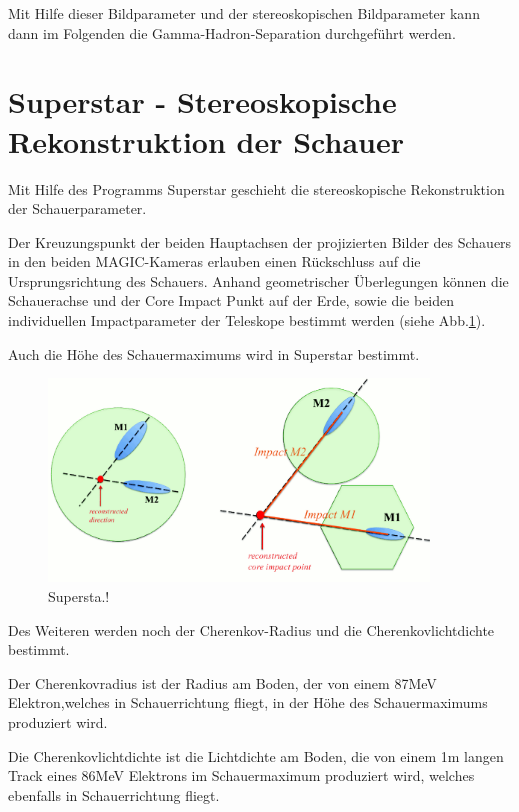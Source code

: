 Mit Hilfe dieser Bildparameter und der stereoskopischen Bildparameter kann dann im Folgenden die Gamma-Hadron-Separation durchgeführt werden.


\section{Superstar - Stereoskopische Rekonstruktion der Schauer}
Mit Hilfe des Programms Superstar geschieht die stereoskopische Rekonstruktion der Schauerparameter.

Der Kreuzungspunkt der beiden Hauptachsen der projizierten Bilder des Schauers in den beiden MAGIC-Kameras erlauben einen Rückschluss auf die Ursprungsrichtung des Schauers.
Anhand geometrischer Überlegungen können die Schauerachse und der Core Impact Punkt auf der Erde, sowie die beiden individuellen Impactparameter der Teleskope bestimmt werden (siehe Abb.\ref{Superstar}).

Auch die Höhe des Schauermaximums wird in Superstar bestimmt.

\begin{figure}
    \centering
    \includegraphics[width=0.9\textwidth]{./Plots/Superstar.png}
    \caption{Supersta.!}
    \label{Superstar}
\end{figure}

Des Weiteren werden noch der Cherenkov-Radius und die Cherenkovlichtdichte bestimmt.

Der Cherenkovradius ist der Radius am Boden, der von einem 87MeV Elektron,welches in Schauerrichtung fliegt, in der Höhe des Schauermaximums produziert wird.

Die Cherenkovlichtdichte ist die Lichtdichte am Boden, die von einem 1m langen Track eines 86MeV Elektrons im Schauermaximum produziert wird, welches ebenfalls in Schauerrichtung fliegt.


